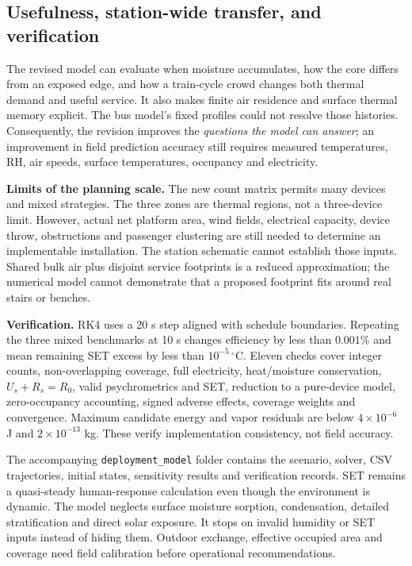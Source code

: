 \subsection{Usefulness, station-wide transfer, and verification}

The revised model can evaluate when moisture accumulates, how the core differs from an exposed edge, and how a train-cycle crowd changes both thermal demand and useful service. It also makes finite air residence and surface thermal memory explicit. The bus model's fixed profiles could not resolve those histories. Consequently, the revision improves the \emph{questions the model can answer}; an improvement in field prediction accuracy still requires measured temperatures, RH, air speeds, surface temperatures, occupancy and electricity.

\noindent\begin{minipage}{\linewidth}
\noindent\textbf{Limits of the planning scale.} The new count matrix permits many devices and mixed strategies. The three zones are thermal regions, not a three-device limit. However, actual net platform area, wind fields, electrical capacity, device throw, obstructions and passenger clustering are still needed to determine an implementable installation. The station schematic cannot establish those inputs. Shared bulk air plus disjoint service footprints is a reduced approximation; the numerical model cannot demonstrate that a proposed footprint fits around real stairs or benches.
\end{minipage}

\noindent\textbf{Verification.} RK4 uses a 20 s step aligned with schedule boundaries. Repeating the three mixed benchmarks at 10 s changes efficiency by less than $0.001\%$ and mean remaining SET excess by less than $10^{-5}\,^{\circ}\mathrm C$. Eleven checks cover integer counts, non-overlapping coverage, full electricity, heat/moisture conservation, $U_s+R_s=R_0$, valid psychrometrics and SET, reduction to a pure-device model, zero-occupancy accounting, signed adverse effects, coverage weights and convergence. Maximum candidate energy and vapor residuals are below $4\times10^{-6}$ J and $2\times10^{-13}$ kg. These verify implementation consistency, not field accuracy.

The accompanying \texttt{deployment\_model} folder contains the scenario, solver, CSV trajectories, initial states, sensitivity results and verification records. SET remains a quasi-steady human-response calculation even though the environment is dynamic. The model neglects surface moisture sorption, condensation, detailed stratification and direct solar exposure. It stops on invalid humidity or SET inputs instead of hiding them. Outdoor exchange, effective occupied area and coverage need field calibration before operational recommendations.
